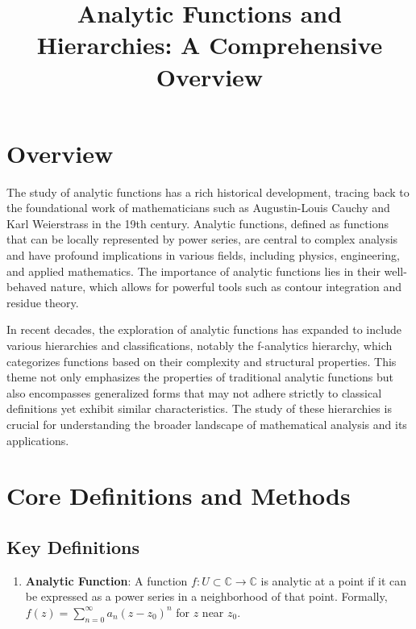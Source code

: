 \documentclass[11pt,a4paper]{article}
\title{Analytic Functions and Hierarchies: A Comprehensive Overview}
\date{}
\begin{document}
\maketitle

\section{Overview}

The study of analytic functions has a rich historical development, tracing back to the foundational work of mathematicians such as Augustin-Louis Cauchy and Karl Weierstrass in the 19th century. Analytic functions, defined as functions that can be locally represented by power series, are central to complex analysis and have profound implications in various fields, including physics, engineering, and applied mathematics. The importance of analytic functions lies in their well-behaved nature, which allows for powerful tools such as contour integration and residue theory.

In recent decades, the exploration of analytic functions has expanded to include various hierarchies and classifications, notably the f-analytics hierarchy, which categorizes functions based on their complexity and structural properties. This theme not only emphasizes the properties of traditional analytic functions but also encompasses generalized forms that may not adhere strictly to classical definitions yet exhibit similar characteristics. The study of these hierarchies is crucial for understanding the broader landscape of mathematical analysis and its applications.

\section{Core Definitions and Methods}

\subsection{Key Definitions}

\begin{enumerate}
\item \textbf{Analytic Function}: A function \( f: U \subset \mathbb{C} \to \mathbb{C} \) is analytic at a point if it can be expressed as a power series in a neighborhood of that point. Formally, \( f(z) = \sum_{n=0}^{\infty} a_n (z - z_0)^n \) for \( z \) near \( z_0 \).
\end{enumerate}
\end{document}
